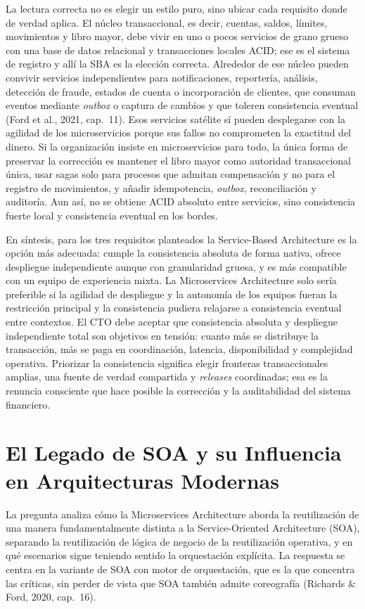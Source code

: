\documentclass[12pt,a4paper]{article}
\begin{document}
La lectura correcta no es elegir un estilo puro, sino ubicar cada requisito donde de verdad aplica. El núcleo transaccional, es decir, cuentas, saldos, límites, movimientos y libro mayor, debe vivir en uno o pocos servicios de grano grueso con una base de datos relacional y transacciones locales ACID; ese es el sistema de registro y allí la SBA es la elección correcta. Alrededor de ese núcleo pueden convivir servicios independientes para notificaciones, reportería, análisis, detección de fraude, estados de cuenta o incorporación de clientes, que consuman eventos mediante \emph{outbox} o captura de cambios y que toleren consistencia eventual (Ford et al., 2021, cap.~11). Esos servicios satélite sí pueden desplegarse con la agilidad de los microservicios porque sus fallos no comprometen la exactitud del dinero. Si la organización insiste en microservicios para todo, la única forma de preservar la corrección es mantener el libro mayor como autoridad transaccional única, usar sagas solo para procesos que admitan compensación y no para el registro de movimientos, y añadir idempotencia, \emph{outbox}, reconciliación y auditoría. Aun así, no se obtiene ACID absoluto entre servicios, sino consistencia fuerte local y consistencia eventual en los bordes.

En síntesis, para los tres requisitos planteados la Service-Based Architecture es la opción más adecuada: cumple la consistencia absoluta de forma nativa, ofrece despliegue independiente aunque con granularidad gruesa, y es más compatible con un equipo de experiencia mixta. La Microservices Architecture solo sería preferible si la agilidad de despliegue y la autonomía de los equipos fueran la restricción principal y la consistencia pudiera relajarse a consistencia eventual entre contextos. El CTO debe aceptar que consistencia absoluta y despliegue independiente total son objetivos en tensión: cuanto más se distribuye la transacción, más se paga en coordinación, latencia, disponibilidad y complejidad operativa. Priorizar la consistencia significa elegir fronteras transaccionales amplias, una fuente de verdad compartida y \emph{releases} coordinadas; esa es la renuncia consciente que hace posible la corrección y la auditabilidad del sistema financiero.

\section{El Legado de SOA y su Influencia en Arquitecturas Modernas}

La pregunta analiza cómo la Microservices Architecture aborda la reutilización de una manera fundamentalmente distinta a la Service-Oriented Architecture (SOA), separando la reutilización de lógica de negocio de la reutilización operativa, y en qué escenarios sigue teniendo sentido la orquestación explícita. La respuesta se centra en la variante de SOA con motor de orquestación, que es la que concentra las críticas, sin perder de vista que SOA también admite coreografía (Richards \& Ford, 2020, cap.~16).
\end{document}
